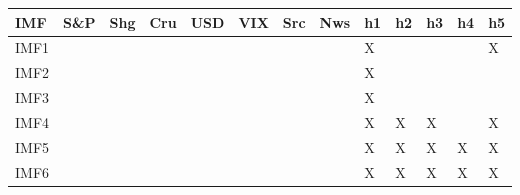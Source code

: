 {\tiny\setlength{\tabcolsep}{1pt}\begin{tabular}{lllllllllllll} \toprule
IMF & S\&P & Shg & Cru & USD & VIX & Src & Nws & h1 & h2 & h3 & h4 & h5 \\ \midrule
IMF1 & & & & & & & & X & & & & X \\ 
IMF2 & & & & & & & & X & & & & \\ 
IMF3 & & & & & & & & X & & & & \\ 
IMF4 & & & & & & & & X & X & X & & X \\ 
IMF5 & & & & & & & & X & X & X & X & X \\ 
IMF6 & & & & & & & & X & X & X & X & X \\ 
\bottomrule \end{tabular}}